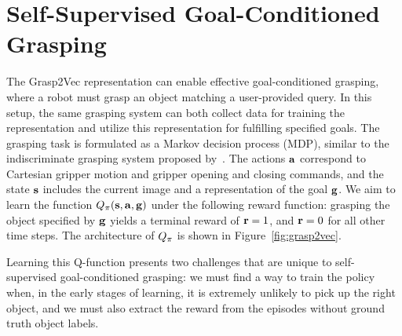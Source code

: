 \documentclass{article}
\begin{document}
\section{Self-Supervised Goal-Conditioned Grasping}
\label{sec:method_grasp}

The Grasp2Vec representation can enable effective goal-conditioned grasping, where a robot must grasp an object matching a user-provided query. In this setup, the same grasping system can both collect data for training the representation and utilize this representation for fulfilling specified goals.
The grasping task is formulated as a Markov decision process (MDP), similar to the indiscriminate grasping system proposed by~\citet{qtopt2018}. The actions $\mathbf{a}$ correspond to Cartesian gripper motion and gripper opening and closing commands, and the state $\mathbf{s}$ includes the current image and a representation of the goal $\mathbf{g}$. We aim to learn the function $Q_{\pi}(\mathbf{s}, \mathbf{a}, \mathbf{g})$ under the following reward function: grasping the object specified by $\mathbf{g}$ yields a terminal reward of $\mathbf{r}=1$, and $\mathbf{r}=0$ for all other time steps. The architecture of $Q_{\pi}$ is shown in Figure~\ref{fig:grasp2vec}.

Learning this Q-function presents two challenges that are unique to self-supervised goal-conditioned grasping: we must find a way to train the policy when, in the early stages of learning, it is extremely unlikely to pick up the right object, and we must also extract the reward from the episodes without ground truth object labels.
\end{document}
